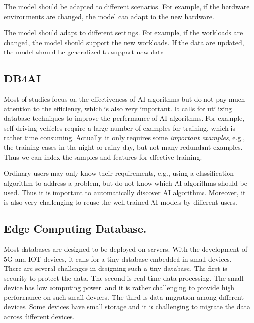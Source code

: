  The model should be adapted to different scenarios. For example, if the hardware environments are changed, the model can adapt to the new hardware. %
  
 The model should adapt to different settings. For example, if the workloads are changed, the model should support the new workloads. If the data are updated, the model should be generalized to support new data. 
 

\subsection{DB4AI}

 Most of studies focus on the effectiveness of AI algorithms but do not pay much attention to the efficiency, which is also very important. It calls for utilizing database techniques to improve the performance of AI algorithms. For example,  self-driving vehicles require a large number of examples for training, which is rather time consuming. Actually, it only requires some {\it important examples}, e.g., the training cases in the night or rainy day, but not many redundant examples. Thus we can index the samples and features for effective training.


 Ordinary users may only know their requirements, e.g., using a classification algorithm to address a problem, but do not know which AI algorithms should be used. Thus it is important to automatically discover AI algorithms. Moreover, it is also very challenging to reuse the well-trained AI models by different users. 




\subsection{Edge Computing Database.} Most databases are designed to be deployed on servers. With the development of 5G and IOT devices, it calls for a tiny database embedded in small devices. There are several challenges in designing such a tiny database. The first is security to protect the data. The second is real-time data processing. The small device has low computing power, and it is rather challenging to provide high performance on such small devices. The third is data migration among different devices. Some devices have small storage and it is challenging to migrate the data across different devices. 

